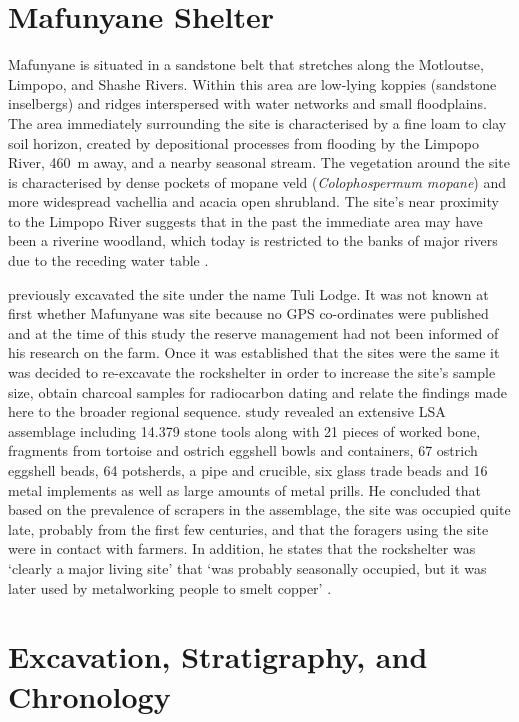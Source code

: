 	\section{Mafunyane Shelter}
	
	Mafunyane is situated in a sandstone belt that stretches along the Motloutse, Limpopo, and Shashe Rivers. Within this area are low-lying koppies (sandstone inselbergs) and ridges interspersed with water networks and small floodplains. The area immediately surrounding the site is characterised by a fine loam to clay soil horizon, created by depositional processes from flooding by the Limpopo River, \SI{460}{\meter} away, and a nearby seasonal stream. The vegetation around the site is characterised by dense pockets of mopane veld (\emph{Colophospermum mopane}) and more widespread vachellia and acacia open shrubland. The site’s near proximity to the Limpopo River suggests that in the past the immediate area may have been a riverine woodland, which today is restricted to the banks of major rivers due to the receding water table \parencite{Alexander_1984}.
	
	\textcite{Walker_1994} previously excavated the site under the name Tuli Lodge. It was not known at first whether Mafunyane was \textcite['s]{Walker_1994} site because no GPS co-ordinates were published and at the time of this study the reserve management had not been informed of his research on the farm. Once it was established that the sites were the same it was decided to re-excavate the rockshelter in order to increase the site’s sample size, obtain charcoal samples for radiocarbon dating and relate the findings made here to the broader regional sequence. \textcite['s]{Walker_1994} study revealed an extensive LSA assemblage including \num{14,379} stone tools along with 21 pieces of worked bone, fragments from tortoise and ostrich eggshell bowls and containers, 67 ostrich eggshell beads, 64 potsherds, a pipe and crucible, six glass trade beads and 16 metal implements as well as large amounts of metal prills. He concluded that based on the prevalence of scrapers in the assemblage, the site was occupied quite late, probably from the first few centuries\AD, and that the foragers using the site were in contact with farmers. In addition, he states that the rockshelter was ‘clearly a major living site’ that ‘was probably seasonally occupied, but it was later used by metalworking people to smelt copper’ \textcite[10]{Walker_1994}. 
	
\section{Excavation, Stratigraphy, and Chronology}

